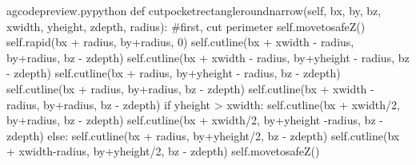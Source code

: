 \documentclass{ltxdoc}
\begin{document}
\lstset{firstnumber=\thegcpy}
\begin{writecode}{a}{gcodepreview.py}{python}
    def cutpocketrectangleroundnarrow(self, bx, by, bz, xwidth, yheight, zdepth, radius):
    #first, cut perimeter
        self.movetosafeZ()
        self.rapid(bx + radius, by+radius, 0)
        self.cutline(bx + xwidth - radius, by+radius, bz - zdepth)
        self.cutline(bx + xwidth - radius, by+yheight - radius, bz - zdepth)
        self.cutline(bx + radius, by+yheight - radius, bz - zdepth)
        self.cutline(bx + radius, by+radius, bz - zdepth)
        self.cutline(bx + xwidth - radius, by+radius, bz - zdepth)
        if yheight > xwidth:
            self.cutline(bx + xwidth/2, by+radius, bz - zdepth)
            self.cutline(bx + xwidth/2, by+yheight -radius, bz - zdepth)
        else:
            self.cutline(bx + radius, by+yheight/2, bz - zdepth)
            self.cutline(bx + xwidth-radius, by+yheight/2, bz - zdepth)
        self.movetosafeZ()


\end{writecode}
\end{document}
